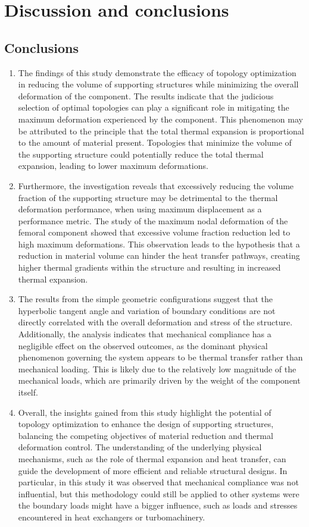 \documentclass[../main.tex]{subfiles}
\begin{document}
\chapter{Discussion and conclusions}

\section{Conclusions}

\begin{enumerate}

  \item The findings of this study demonstrate the efficacy of topology optimization in reducing the volume of supporting structures while minimizing the overall deformation of the component. The results indicate that the judicious selection of optimal topologies can play a significant role in mitigating the maximum deformation experienced by the component. This phenomenon may be attributed to the principle that the total thermal expansion is proportional to the amount of material present. Topologies that minimize the volume of the supporting structure could potentially reduce the total thermal expansion, leading to lower maximum deformations.  
  \item Furthermore, the investigation reveals that excessively reducing the volume fraction of the supporting structure may be detrimental to the thermal deformation performance, when using maximum displacement as a performance metric. The study of the maximum nodal deformation of the femoral component showed that excessive volume fraction reduction led to high maximum deformations. This observation leads to the hypothesis that a reduction in material volume can hinder the heat transfer pathways, creating higher thermal gradients within the structure and resulting in increased thermal expansion. 
  \item The results from the simple geometric configurations suggest that the hyperbolic tangent angle and variation of boundary conditions are not directly correlated with the overall deformation and stress of the structure. Additionally, the analysis indicates that mechanical compliance has a negligible effect on the observed outcomes, as the dominant physical phenomenon governing the system appears to be thermal transfer rather than mechanical loading. This is likely due to the relatively low magnitude of the mechanical loads, which are primarily driven by the weight of the component itself.
  \item Overall, the insights gained from this study highlight the potential of topology optimization to enhance the design of supporting structures, balancing the competing objectives of material reduction and thermal deformation control. The understanding of the underlying physical mechanisms, such as the role of thermal expansion and heat transfer, can guide the development of more efficient and reliable structural designs. In particular, in this study it was observed that mechanical compliance was not influential, but this methodology could still be applied to other systems were the boundary loads might have a bigger influence, such as loads and stresses encountered in heat exchangers or turbomachinery.
  

\end{enumerate}
\end{document}
